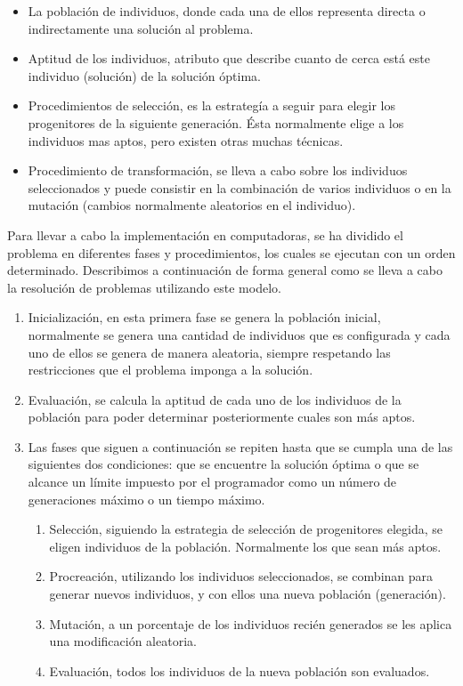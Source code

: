 \begin{itemize}
	\item La población de individuos, donde cada una de ellos representa directa o indirectamente una solución al problema.
	\item Aptitud de los individuos, atributo que describe cuanto de cerca est\'a este individuo (solución) de la solución \'optima. 
	\item Procedimientos de selección, es la estrateg\'ia a seguir para elegir los progenitores de la siguiente generaci\'on. \'Esta normalmente elige a los individuos mas aptos, pero existen otras muchas técnicas.
	\item Procedimiento de transformaci\'on, se lleva a cabo sobre los individuos seleccionados y puede consistir en la combinación de varios individuos o en la mutación (cambios normalmente aleatorios en el individuo).
\end{itemize}

Para llevar a cabo la implementación en computadoras, se ha dividido el problema en diferentes fases y procedimientos, los cuales se ejecutan con un orden determinado. Describimos a continuación de forma general como se lleva a cabo la resolución de problemas utilizando este modelo.

\begin{enumerate}
	\item Inicializaci\'on, en esta primera fase se genera la población inicial, normalmente se genera una cantidad de individuos que es configurada y cada uno de ellos se genera de manera aleatoria, siempre respetando las restricciones que el problema imponga a la solución.
	\item Evaluaci\'on, se calcula la aptitud de cada uno de los individuos de la población para poder determinar posteriormente cuales son m\'as aptos.
	\item Las fases que siguen a continuación se repiten hasta que se cumpla una de las siguientes dos condiciones: que se encuentre la solución \'optima o que se alcance un l\'imite impuesto por el programador como un n\'umero de generaciones máximo o un tiempo máximo.
	\begin{enumerate}
		\item Selección, siguiendo la estrategia de selección de progenitores elegida, se eligen individuos de la población. Normalmente los que sean m\'as aptos.
		\item Procreaci\'on, utilizando los individuos seleccionados, se combinan para generar nuevos individuos, y con ellos una nueva población (generación).
		\item Mutaci\'on, a un porcentaje de los individuos recién generados se les aplica una modificación aleatoria.
		\item Evaluaci\'on, todos los individuos de la nueva poblaci\'on son evaluados.
	\end{enumerate}
\end{enumerate}

